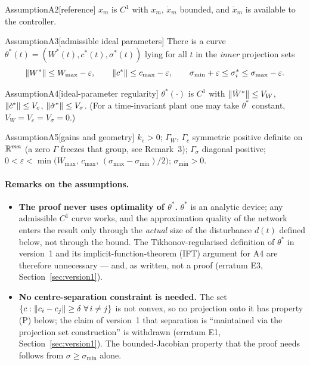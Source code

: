 \begin{rmk}{Assumption}{A2}[reference]
$x_m$ is $C^1$ with $x_m$, $\dot x_m$ bounded, and $\dot x_m$ is available to the controller.
\end{rmk}

\begin{rmk}{Assumption}{A3}[admissible ideal parameters]
There is a curve $\theta^*(t)=(W^*(t),c^*(t),\sigma^*(t))$ lying for all $t$ in the \emph{inner} projection sets
\[
\lVert W^*\rVert\le W_{\max}-\varepsilon,\qquad \lVert c^*\rVert\le c_{\max}-\varepsilon,\qquad
\sigma_{\min}+\varepsilon\le\sigma^*_i\le\sigma_{\max}-\varepsilon.
\]
\end{rmk}

\begin{rmk}{Assumption}{A4}[ideal-parameter regularity]
$\theta^*(\cdot)$ is $C^1$ with $\lVert \dot W^*\rVert\le V_W$, $\lVert \dot c^*\rVert\le V_c$, $\lVert \dot\sigma^*\rVert\le V_\sigma$.
(For a time-invariant plant one may take $\theta^*$ constant, $V_W=V_c=V_\sigma=0$.)
\end{rmk}

\begin{rmk}{Assumption}{A5}[gains and geometry]
$k_e>0$; $\Gamma_W$, $\Gamma_c$ symmetric positive definite on $\mathbb{R}^{mn}$ (a zero $\Gamma$ freezes that group, see
Remark~3); $\Gamma_\sigma$ diagonal positive; $0<\varepsilon<\min\bigl(W_{\max},\,c_{\max},\,(\sigma_{\max}-\sigma_{\min})/2\bigr)$;
$\sigma_{\min}>0$.
\end{rmk}

\paragraph{Remarks on the assumptions.}
\begin{itemize}
\item \textbf{The proof never uses optimality of $\theta^*$.} $\theta^*$ is an analytic device; any admissible $C^1$
  curve works, and the approximation quality of the network enters the result only through the \emph{actual} size of
  the disturbance $d(t)$ defined below, not through the bound. The Tikhonov-regularised definition of $\theta^*$ in
  version~1 and its implicit-function-theorem (IFT) argument for A4 are therefore unnecessary --- and, as written, not a
  proof (erratum E3, Section~\ref{sec:version1}).
\item \textbf{No centre-separation constraint is needed.} The set $\{c:\lVert c_i-c_j\rVert\ge\delta\ \forall\, i\ne j\}$ is
  not convex, so no projection onto it has property (P) below; the claim of version~1 that separation is ``maintained
  via the projection set construction'' is withdrawn (erratum E1, Section~\ref{sec:version1}). The bounded-Jacobian
  property that the proof needs follows from $\sigma\ge\sigma_{\min}$ alone.
\end{itemize}

